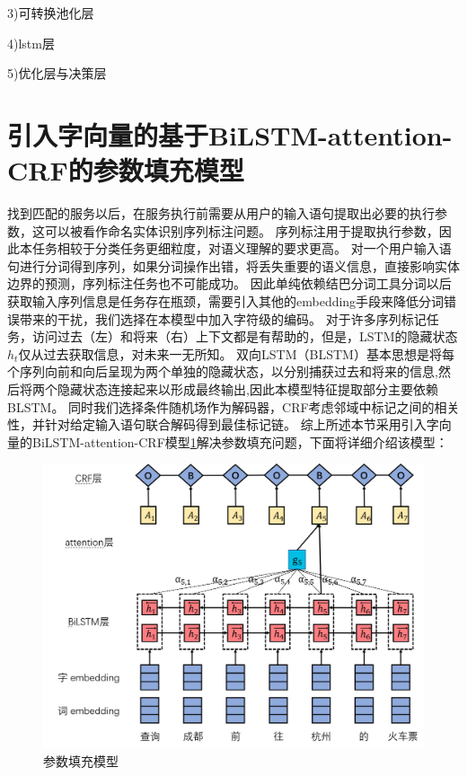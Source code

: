 3)可转换池化层


4)lstm层

5)优化层与决策层

\section{引入字向量的基于BiLSTM-attention-CRF的参数填充模型}
找到匹配的服务以后，在服务执行前需要从用户的输入语句提取出必要的执行参数，这可以被看作命名实体识别序列标注问题。
序列标注用于提取执行参数，因此本任务相较于分类任务更细粒度，对语义理解的要求更高。
对一个用户输入语句进行分词得到序列，如果分词操作出错，将丢失重要的语义信息，直接影响实体边界的预测，序列标注任务也不可能成功。
因此单纯依赖结巴分词工具分词以后获取输入序列信息是任务存在瓶颈，需要引入其他的embedding手段来降低分词错误带来的干扰，我们选择在本模型中加入字符级的编码。
对于许多序列标记任务，访问过去（左）和将来（右）上下文都是有帮助的，但是，LSTM的隐藏状态$h_t$仅从过去获取信息，对未来一无所知。 
双向LSTM（BLSTM）基本思想是将每个序列向前和向后呈现为两个单独的隐藏状态，以分别捕获过去和将来的信息,然后将两个隐藏状态连接起来以形成最终输出,因此本模型特征提取部分主要依赖BLSTM。
同时我们选择条件随机场作为解码器，CRF考虑邻域中标记之间的相关性，并针对给定输入语句联合解码得到最佳标记链。
综上所述本节采用引入字向量的BiLSTM-attention-CRF模型\ref{fig:blstm-att-crf}解决参数填充问题，下面将详细介绍该模型：

\begin{figure}[htbp]
  \centering
  \includegraphics[scale=0.5]{./images/blstm-att-crf.jpg}
  \caption{参数填充模型}
  \label{fig:blstm-att-crf}
\end{figure}

